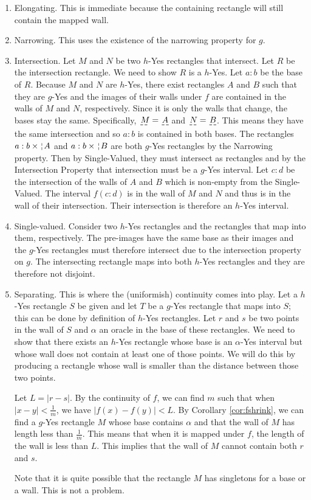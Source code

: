 \documentclass[12pt]{article}
\theoremstyle{remark}
\begin{document}
\begin{enumerate} 
\item Elongating. This is immediate because the containing rectangle will still contain the mapped wall. 
\item Narrowing. This uses the existence of the narrowing property for $g$. 
\item Intersection. Let $M$ and $N$ be two $h$-Yes rectangles that intersect. Let $R$ be the intersection rectangle. We need to show $R$ is a $h$-Yes. Let $a:b$ be the base of $R$. Because $M$ and $N$ are $h$-Yes, there exist rectangles $A$ and $B$ such that they are $g$-Yes and the images of their walls under $f$ are contained in the walls of $M$ and $N$, respectively. Since it is only the walls that change, the bases stay the same. Specifically, $\base{M} = \base{A}$ and $\base{N} = \base{B}$. This means they have the same intersection and so $a:b$ is contained in both bases. The rectangles $a:b \times \wall{A}$ and $a:b \times \wall{B}$ are both $g$-Yes rectangles by the Narrowing property. Then by Single-Valued, they must intersect as rectangles and by the Intersection Property that intersection must be a $g$-Yes interval. Let $c:d$ be the intersection of the walls of $A$ and $B$ which is non-empty from the Single-Valued. The interval $f(c:d)$ is in the wall of $M$ and $N$ and thus is in the wall of their intersection. Their intersection is therefore an $h$-Yes interval. 
\item Single-valued. Consider two $h$-Yes rectangles and the rectangles that map into them, respectively. The pre-images have the same base as their images and the $g$-Yes rectangles must therefore intersect due to the intersection property on $g$. The intersecting rectangle maps into both $h$-Yes rectangles and they are therefore not disjoint.  

\item Separating. This is where the (uniformish) continuity comes into play. Let a $h$-Yes rectangle $S$ be given and let $T$ be a $g$-Yes rectangle that maps into $S$; this can be done by definition of $h$-Yes rectangles. Let $r$ and $s$ be two points in the wall of $S$ and $\alpha$ an oracle in the base of these rectangles. We need to show that there exists an $h$-Yes rectangle whose base is an $\alpha$-Yes interval but whose wall does not contain at least one of those points. We will do this by producing a rectangle whose wall is smaller than the distance between those two points. 

Let $L = |r-s|$. By the continuity of $f$, we can find $m$ such that when $|x-y| < \frac{1}{m}$, we have $|f(x) - f(y)| < L$. By Corollary \ref{cor:fshrink}, we can find a $g$-Yes rectangle $M$ whose base contains $\alpha$ and that the wall of $M$ has length less than $\frac{1}{m}$. This means that when it is mapped under $f$, the length of the wall is less than $L$. This implies that the wall of $M$ cannot contain both $r$ and $s$.

Note that it is quite possible that the rectangle $M$ has singletons for a base or a wall. This is not a problem. 

\end{enumerate}
\end{document}
